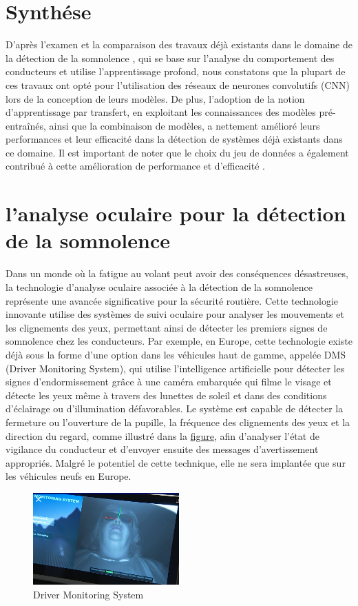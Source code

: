 \section{Synthése}
D'après l'examen et la comparaison des travaux déjà existants dans le domaine de la détection de la somnolence , qui se base sur l'analyse du comportement des conducteurs et utilise l'apprentissage profond, nous constatons que la plupart de ces travaux ont opté pour l'utilisation des réseaux de neurones convolutifs (CNN) lors de la conception de leurs modèles. De plus, l'adoption de la notion d'apprentissage par transfert, en exploitant les connaissances des modèles pré-entraînés, ainsi que la combinaison de modèles, a nettement amélioré leurs performances et leur efficacité dans la détection de systèmes déjà existants dans ce domaine. Il est important de noter que le choix du jeu de données a également contribué à cette amélioration de performance et d'efficacité .

\section{l'analyse oculaire pour la détection de la somnolence }
Dans un monde où la fatigue au volant peut avoir des conséquences désastreuses, la technologie d'analyse oculaire associée à la détection de la somnolence représente une avancée significative pour la sécurité routière. Cette technologie innovante utilise des systèmes de suivi oculaire pour analyser les mouvements et les clignements des yeux, permettant ainsi de détecter les premiers signes de somnolence chez les conducteurs. Par exemple, en Europe, cette technologie existe déjà sous la forme d'une option dans les véhicules haut de gamme, appelée DMS (Driver Monitoring System), qui utilise l'intelligence artificielle pour détecter les signes d'endormissement grâce à une caméra embarquée qui filme le visage et détecte les yeux même à travers des lunettes de soleil et dans des conditions d'éclairage ou d'illumination défavorables. Le système est capable de détecter la fermeture ou l'ouverture de la pupille, la fréquence des clignements des yeux et la direction du regard, comme illustré dans la \hyperlink{figDMS}{figure}, afin d'analyser l'état de vigilance du conducteur et d'envoyer ensuite des messages d'avertissement appropriés. Malgré le potentiel de cette technique, elle ne sera implantée que sur les véhicules neufs en Europe\cite{DMS}.
\begin{figure}[htbp]
    \centering
    \includegraphics[width=0.5\textwidth ]{img/DMS.png}
    \caption{Driver Monitoring System }
    \hypertarget{figDMS}{}
    
\end{figure}
